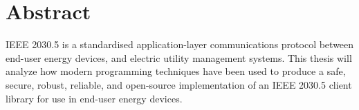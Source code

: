\chapter*{Abstract}\label{abstract}
IEEE 2030.5 is a standardised application-layer communications protocol between end-user energy devices, and electric utility management systems.
This thesis will analyze how modern programming techniques have been used to produce a safe, secure, robust, reliable, and open-source implementation of an IEEE 2030.5 client library for use in end-user energy devices.
